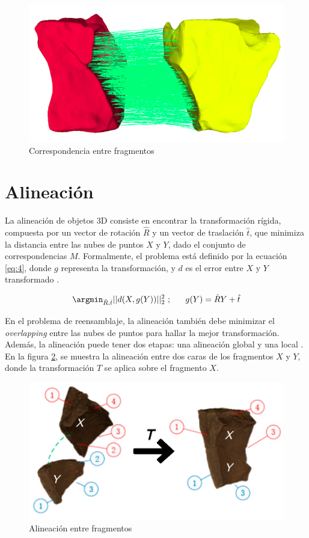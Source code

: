 \begin{figure}[!h]
    \centering
    \includegraphics[scale=0.18]{images/correspondencia.png}
    \caption{Correspondencia entre fragmentos \cite{5}}
    \label{fig:correspondencia}
\end{figure}

\section{Alineación}
La alineación de objetos 3D consiste en encontrar la transformación rígida, compuesta por un vector de rotación $\hat{R}$ y un vector de traslación  $\hat{t}$, que minimiza la distancia entre las nubes de puntos $X$ y $Y$, dado el conjunto de correspondencias $M$. Formalmente, el problema está definido por la ecuación \ref{eq:4}, donde $g$ representa la transformación, y $d$ es el error entre $X$ y $Y$ transformado \cite{9}. 

\begin{equation} \label{eq:4}
    \argmin_{\hat{R}, \hat{t}}||d(X, g(Y))||^2_2 \ ; \ \ \ \ \ g(Y) = \hat{R}Y + \hat{t}
\end{equation}

En el problema de reensamblaje, la alineación también debe minimizar el \textit{overlapping} entre las nubes de puntos para hallar la mejor transformación. Además, la alineación puede tener dos etapas: una alineación global y una local \cite{2}. En la figura \ref{fig:alineacion}, se muestra la alineación entre dos caras de los fragmentos $X$ y $Y$, donde la transformación $T$ se aplica sobre el fragmento $X$.

\begin{figure}[!h]
    \centering
    \includegraphics[scale=0.19]{images/alineacion.png}
    \caption{Alineación entre fragmentos \cite{6}}
    \label{fig:alineacion}
\end{figure}

